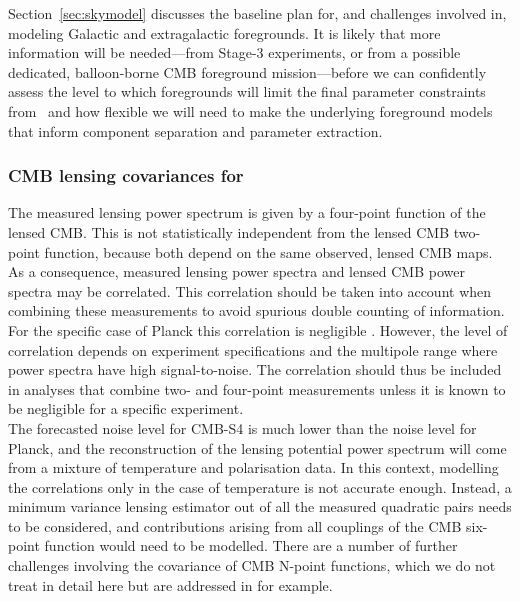 Section~\ref{sec:skymodel} discusses the baseline plan for, and challenges involved in, modeling
Galactic and extragalactic foregrounds. It is likely that more information will be needed---from 
Stage-3 experiments, or from a possible dedicated, balloon-borne CMB foreground mission---before
we can confidently assess the level to which foregrounds will limit the final parameter constraints
from \cmbexp\ and how flexible we will need to make the underlying foreground models that 
inform component separation and parameter extraction. 

\subsubsection{CMB lensing covariances for \cmbexp }
\label{se:covs}

The measured lensing power spectrum is given by a four-point function of the lensed CMB. 
This is not statistically independent from the lensed CMB two-point function, because both depend on the same observed, lensed CMB maps. 
As a consequence, measured lensing power spectra and lensed CMB power spectra may be correlated. 
This correlation should be taken into account when combining these measurements to avoid spurious double counting of information. 
For the specific case of Planck this correlation is negligible \cite{Schmittfull:2013uea}. 
However, the level of correlation depends on experiment specifications and the multipole range where power spectra have high signal-to-noise. 
The correlation should thus be included in analyses that combine two- and four-point measurements unless it is known to be negligible for a specific experiment.
\\

The forecasted noise level for CMB-S4 is much lower than the noise level for Planck, and the reconstruction of the lensing potential power spectrum will come from a mixture of temperature and polarisation data.
In this context, modelling the correlations only in the case of temperature is not accurate enough.
Instead, a minimum variance lensing estimator out of all the measured quadratic pairs needs to be considered, and contributions arising from all couplings of the CMB six-point function would need to be modelled.
There are a number of further challenges involving the covariance of CMB N-point functions, which we do not treat in detail here but are addressed in \cite{Peloton:prep} for example. 
\\

